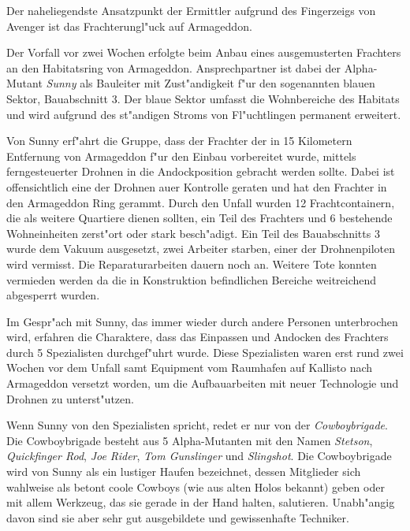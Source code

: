 
Der naheliegendste Ansatzpunkt der Ermittler aufgrund des Fingerzeigs von Avenger ist das Frachterungl"uck auf Armageddon.

Der Vorfall vor zwei Wochen erfolgte beim Anbau eines ausgemusterten Frachters an den Habitatsring von Armageddon. Ansprechpartner ist dabei der Alpha-Mutant \emph{Sunny} als Bauleiter mit Zust"andigkeit f"ur den sogenannten blauen Sektor, Bauabschnitt 3. Der blaue Sektor umfasst die Wohnbereiche des Habitats und wird aufgrund des st"andigen Stroms von Fl"uchtlingen permanent erweitert.

Von Sunny erf"ahrt die Gruppe, dass der Frachter der in 15 Kilometern Entfernung von Armageddon f"ur den Einbau vorbereitet wurde, mittels ferngesteuerter Drohnen in die Andockposition gebracht werden sollte. Dabei ist offensichtlich eine der Drohnen au\3er Kontrolle geraten und hat den Frachter in den Armageddon Ring gerammt. Durch den Unfall wurden 12 Frachtcontainern, die als weitere Quartiere dienen sollten, ein Teil des Frachters und 6 bestehende Wohneinheiten zerst"ort oder stark besch"adigt. Ein Teil des Bauabschnitts 3 wurde dem Vakuum ausgesetzt, zwei Arbeiter starben, einer der Drohnenpiloten wird vermisst. Die Reparaturarbeiten dauern noch an. Weitere Tote konnten vermieden werden da die in Konstruktion befindlichen Bereiche weitreichend abgesperrt wurden.

Im Gespr"ach mit Sunny, das immer wieder durch andere Personen unterbrochen wird, erfahren die Charaktere, dass das Einpassen und Andocken des Frachters durch 5 Spezialisten durchgef"uhrt wurde. Diese Spezialisten waren erst rund zwei Wochen vor dem Unfall samt Equipment vom  Raumhafen auf Kallisto nach Armageddon versetzt worden, um die Aufbauarbeiten mit neuer Technologie und Drohnen zu unterst"utzen.

Wenn Sunny von den Spezialisten spricht, redet er nur von der \emph{Cowboybrigade}. Die Cowboybrigade besteht aus 5 Alpha-Mutanten mit den Namen \emph{Stetson}, \emph{Quickfinger Rod}, \emph{Joe Rider}, \emph{Tom Gunslinger} und \emph{Slingshot}. Die Cowboybrigade wird von Sunny als ein lustiger Haufen bezeichnet, dessen Mitglieder sich wahlweise als betont coole Cowboys (wie aus alten Holos bekannt) geben oder mit allem Werkzeug, das sie gerade in der Hand halten, salutieren. Unabh"angig davon sind sie aber sehr gut ausgebildete und gewissenhafte Techniker.

